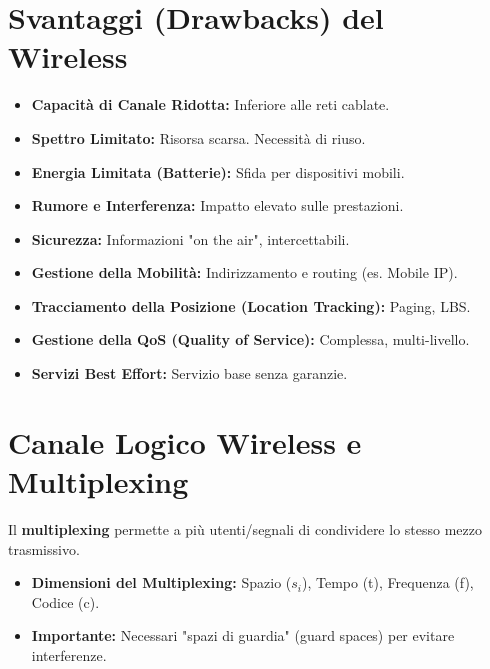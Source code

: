 \section{Svantaggi (Drawbacks) del Wireless}
\begin{itemize}
    \item \textbf{Capacità di Canale Ridotta:} Inferiore alle reti cablate.
    \item \textbf{Spettro Limitato:} Risorsa scarsa. Necessità di riuso.
    \item \textbf{Energia Limitata (Batterie):} Sfida per dispositivi mobili.
    \item \textbf{Rumore e Interferenza:} Impatto elevato sulle prestazioni.
    \item \textbf{Sicurezza:} Informazioni "on the air", intercettabili.
    \item \textbf{Gestione della Mobilità:} Indirizzamento e routing (es. Mobile IP).
    \item \textbf{Tracciamento della Posizione (Location Tracking):} Paging, LBS.
    \item \textbf{Gestione della QoS (Quality of Service):} Complessa, multi-livello.
    \item \textbf{Servizi Best Effort:} Servizio base senza garanzie.
\end{itemize}

\section{Canale Logico Wireless e Multiplexing}
Il \textbf{multiplexing} permette a più utenti/segnali di condividere lo stesso mezzo trasmissivo.
\begin{itemize}
    \item \textbf{Dimensioni del Multiplexing:} Spazio ($s_i$), Tempo (t), Frequenza (f), Codice (c).
    \item \textbf{Importante:} Necessari "spazi di guardia" (guard spaces) per evitare interferenze.
\end{itemize}

